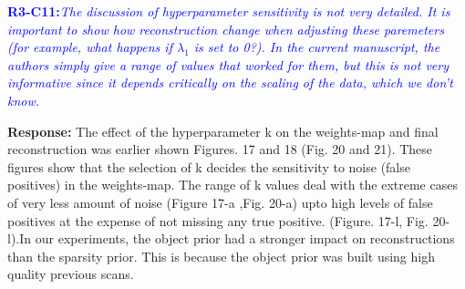 \documentclass{article}
\begin{document}
\textcolor{blue}{\textbf{R3-C11:}\textit{The discussion of hyperparameter sensitivity is not very detailed. It is important to show how reconstruction change when adjusting these paremeters (for example, what happens if $\lambda_1$ is set to 0?). In the current manuscript, the authors simply give a range of values that worked for them, but this is not very informative since it depends critically on the scaling of the data, which we don't know.}}

\textbf{Response:} The effect of the hyperparameter k on the weights-map and final reconstruction was earlier shown Figures. 17 and 18 (Fig. 20 and 21). These figures show that the selection of k decides the sensitivity to noise (false positives) in the weights-map. The range of k values deal with the extreme cases of very less amount of noise (Figure 17-a ,Fig. 20-a) upto high levels of false positives at the expense of not missing any true positive. (Figure. 17-l, Fig. 20-l).In our experiments, the object prior had a stronger impact on reconstructions than the sparsity prior. This is because the object prior was built using high quality previous scans. 
\end{document}
